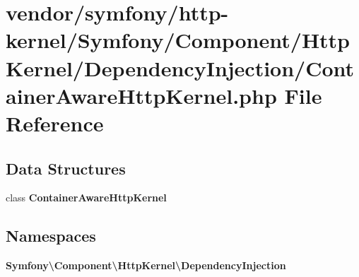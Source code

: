 \section{vendor/symfony/http-\/kernel/\+Symfony/\+Component/\+Http\+Kernel/\+Dependency\+Injection/\+Container\+Aware\+Http\+Kernel.php File Reference}
\label{_container_aware_http_kernel_8php}
\subsection*{Data Structures}
\begin{DoxyCompactItemize}
\item 
class {\bf Container\+Aware\+Http\+Kernel}
\end{DoxyCompactItemize}
\subsection*{Namespaces}
\begin{DoxyCompactItemize}
\item 
 {\bf Symfony\textbackslash{}\+Component\textbackslash{}\+Http\+Kernel\textbackslash{}\+Dependency\+Injection}
\end{DoxyCompactItemize}
